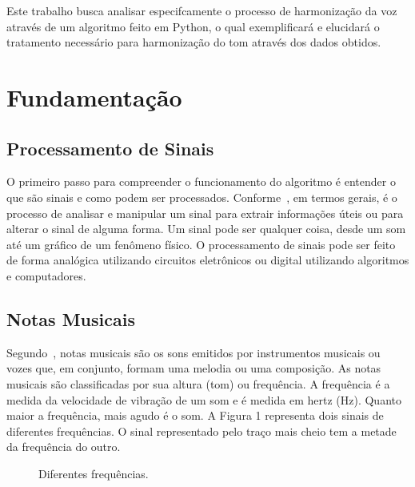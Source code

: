 \documentclass{sbrt}
\begin{document}
Este trabalho busca analisar especifcamente o processo de harmonização da voz através de um algoritmo feito em Python, o qual exemplificará e elucidará o tratamento necessário para harmonização do tom através dos dados obtidos.


\section{Fundamentação}

\subsection{Processamento de Sinais}

O primeiro passo para compreender o funcionamento do algoritmo é entender o que são sinais e como podem ser processados. Conforme~\cite{prandoni2008signal}, em termos gerais, é o processo de analisar e manipular um sinal para extrair informações úteis ou para alterar o sinal de alguma forma. Um sinal pode ser qualquer coisa, desde um som até um gráfico de um fenômeno físico. O processamento de sinais pode ser feito de forma analógica utilizando circuitos eletrônicos ou digital utilizando algoritmos e computadores.

\subsection{Notas Musicais}

Segundo~\cite{moretti2003prototipo}, notas musicais são os sons emitidos por instrumentos musicais ou vozes que, em conjunto, formam uma melodia ou uma composição. As notas musicais são classificadas por sua altura (tom) ou frequência. A frequência é a medida da velocidade de vibração de um som e é medida em hertz (Hz). Quanto maior a frequência, mais agudo é o som. A Figura 1 representa dois sinais de diferentes frequências. O sinal representado pelo traço mais cheio tem a metade da frequência do outro.


\begin{figure}[ht]
  \centering
  \caption{\label{fig:sine}Diferentes frequências.}
\end{figure}
\end{document}
